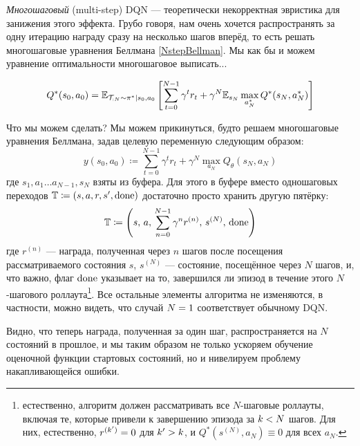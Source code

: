 \emph{Многошаговый} (multi-step) DQN --- теоретически некорректная эвристика для занижения этого эффекта. Грубо говоря, нам очень хочется распространять за одну итерацию награду сразу на несколько шагов вперёд, то есть решать многошаговые уравнения Беллмана \eqref{NstepBellman}. Мы как бы и можем уравнение оптимальности многошаговое выписать...

\begin{proposition}
\begin{equation}\label{NstepOptimBellman}
 Q^*(s_0, a_0) = \mathbb{E}_{\mathcal{T}_{:N} \sim \pi^* \mid s_0, a_0} \left[ \sum_{t=0}^{N-1} \gamma^{t}r_t + \gamma^N \mathbb{E}_{s_N} \max_{a^*_N} Q^*(s_N, a^*_N) \right]   
\end{equation}
\end{proposition}

Что мы можем сделать? Мы можем прикинуться, будто решаем многошаговые уравнения Беллмана, задав целевую переменную следующим образом:
\begin{equation}\label{Nsteptarget}
y(s_0, a_0) \coloneqq \sum_{t=0}^{N-1} \gamma^{t}r_t + \gamma^N \max_{a_N} Q_{\theta}(s_N, a_N)
\end{equation}
где $s_1, a_1 \dots a_{N-1}, s_N$ взяты из буфера. Для этого в буфере вместо одношаговых переходов $\T \HM\coloneqq (s, a, r, s', \done)$ достаточно просто хранить другую пятёрку:
$$\mathbb{T} \coloneqq \left( s, \, a, \, \sum_{n=0}^{N-1} \gamma^{n}r^{(n)}, \, s^{(N)}, \, \mathrm{done} \right)$$
где $r^{(n)}$ --- награда, полученная через $n$ шагов после посещения рассматриваемого состояния $s$, $s^{(N)}$ --- состояние, посещённое через $N$ шагов, и, что важно, флаг $\mathrm{done}$ указывает на то, завершился ли эпизод в течение этого $N$-шагового роллаута\footnote{естественно, алгоритм должен рассматривать все $N$-шаговые роллауты, включая те, которые привели к завершению эпизода за $k \HM< N$ шагов. Для них, естественно, $r^{(k')} \HM= 0$ для $k' \HM> k$, и $Q^*(s^{(N)}, a_N) \equiv 0$ для всех $a_N$.}. Все остальные элементы алгоритма не изменяются, в частности, можно видеть, что случай $N \HM= 1$ соответствует обычному DQN.

Видно, что теперь награда, полученная за один шаг, распространяется на $N$ состояний в прошлое, и мы таким образом не только ускоряем обучение оценочной функции стартовых состояний, но и нивелируем проблему накапливающейся ошибки. 

